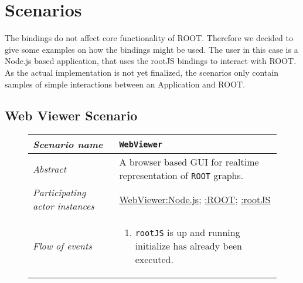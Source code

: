 \section{Scenarios}

The bindings do not affect core functionality of ROOT. Therefore 
we decided to give some examples on how the bindings might be used. The 
user in this case is a Node.js based application, that uses the rootJS bindings 
to interact with ROOT. As the actual implementation is not yet 
finalized, the scenarios only contain samples of simple interactions 
between an Application and ROOT.

\subsection{Web Viewer Scenario}
\begin{figure}[htb]
	\centering
	\begin{longtable}{p{3cm} @{\hskip 1cm} p{12cm}}
		\hline
		
		\textit{Scenario name} &  \texttt{WebViewer}\\
		\hline
	
		\textit{Abstract} & A browser based GUI for realtime representation of \texttt{ROOT} graphs.\\
		\hline
	
		\textit{Participating actor instances} & \underline{WebViewer:Node.js}\footnotemark; \underline{:ROOT}; \underline{:rootJS}\\
		\hline
	
		\textit{Flow of events} & 
		\begin{enumerate}
			\item \texttt{rootJS} is up and running initialize has already been executed.
			

\end{enumerate}
\end{longtable}
\end{figure}

